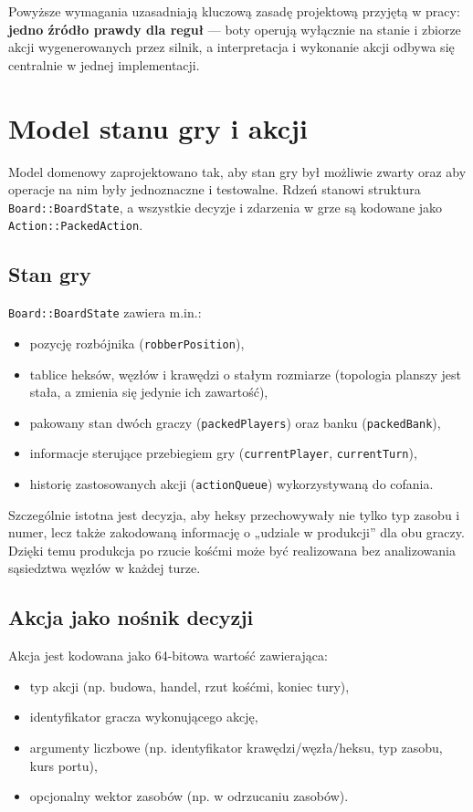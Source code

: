 \documentclass[polish,inz,longabstract]{iithesis}
\begin{document}
Powyższe wymagania uzasadniają kluczową zasadę projektową przyjętą w pracy: \textbf{jedno źródło prawdy dla reguł} — boty operują wyłącznie na stanie i zbiorze akcji wygenerowanych przez silnik, a interpretacja i wykonanie akcji odbywa się centralnie w jednej implementacji.

\section{Model stanu gry i akcji}

Model domenowy zaprojektowano tak, aby stan gry był możliwie zwarty oraz aby operacje na nim były jednoznaczne i testowalne. Rdzeń stanowi struktura \newline \texttt{Board::BoardState}, a wszystkie decyzje i zdarzenia w grze są kodowane jako \newline \texttt{Action::PackedAction}.

\subsection{Stan gry}

\texttt{Board::BoardState} zawiera m.in.:
\begin{itemize}
\item pozycję rozbójnika (\texttt{robberPosition}),
\item tablice heksów, węzłów i krawędzi o stałym rozmiarze (topologia planszy jest stała, a zmienia się jedynie ich zawartość),
\item pakowany stan dwóch graczy (\texttt{packedPlayers}) oraz banku (\texttt{packedBank}),
\item informacje sterujące przebiegiem gry (\texttt{currentPlayer}, \texttt{currentTurn}),
\item historię zastosowanych akcji (\texttt{actionQueue}) wykorzystywaną do cofania.
\end{itemize}

Szczególnie istotna jest decyzja, aby heksy przechowywały nie tylko typ zasobu i numer, lecz także zakodowaną informację o „udziale w produkcji” dla obu graczy. Dzięki temu produkcja po rzucie kośćmi może być realizowana bez analizowania sąsiedztwa węzłów w każdej turze.

\subsection{Akcja jako nośnik decyzji}

Akcja jest kodowana jako 64-bitowa wartość zawierająca:
\begin{itemize}
\item typ akcji (np. budowa, handel, rzut kośćmi, koniec tury),
\item identyfikator gracza wykonującego akcję,
\item argumenty liczbowe (np. identyfikator krawędzi/węzła/heksu, typ zasobu, kurs portu),
\item opcjonalny wektor zasobów (np. w odrzucaniu zasobów).
\end{itemize}
\end{document}

